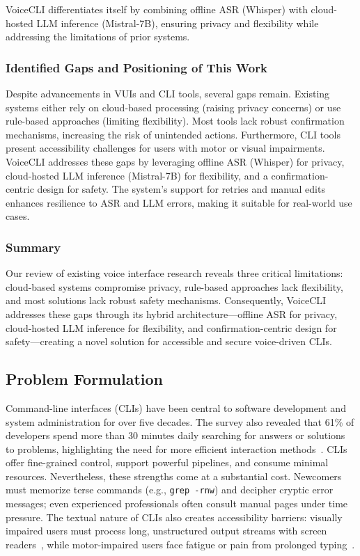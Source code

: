 \documentclass[a4paper,12pt]{article}
\begin{document}
VoiceCLI differentiates itself by combining offline ASR (Whisper) with cloud-hosted LLM inference (Mistral-7B), ensuring privacy and flexibility while addressing the limitations of prior systems.

\subsubsection{Identified Gaps and Positioning of This Work}
Despite advancements in VUIs and CLI tools, several gaps remain. Existing systems either rely on cloud-based processing (raising privacy concerns) or use rule-based approaches (limiting flexibility). Most tools lack robust confirmation mechanisms, increasing the risk of unintended actions. Furthermore, CLI tools present accessibility challenges for users with motor or visual impairments. VoiceCLI addresses these gaps by leveraging offline ASR (Whisper) for privacy, cloud-hosted LLM inference (Mistral-7B) for flexibility, and a confirmation-centric design for safety. The system's support for retries and manual edits enhances resilience to ASR and LLM errors, making it suitable for real-world use cases.

\subsubsection{Summary}
Our review of existing voice interface research reveals three critical limitations: cloud-based systems compromise privacy, rule-based approaches lack flexibility, and most solutions lack robust safety mechanisms. Consequently, VoiceCLI addresses these gaps through its hybrid architecture—offline ASR for privacy, cloud-hosted LLM inference for flexibility, and confirmation-centric design for safety—creating a novel solution for accessible and secure voice-driven CLIs.


\subsection{Problem Formulation}

Command-line interfaces (CLIs) have been central to software development and system administration for over five decades. The survey also revealed that 61\% of developers spend more than 30 minutes daily searching for answers or solutions to problems, highlighting the need for more efficient interaction methods~\cite{ref2}. CLIs offer fine-grained control, support powerful pipelines, and consume minimal resources. Nevertheless, these strengths come at a substantial cost. Newcomers must memorize terse commands (e.g., \texttt{grep -rnw}) and decipher cryptic error messages; even experienced professionals often consult manual pages under time pressure. The textual nature of CLIs also creates accessibility barriers: visually impaired users must process long, unstructured output streams with screen readers~\cite{ref3}, while motor-impaired users face fatigue or pain from prolonged typing~\cite{ref4}.
\end{document}
